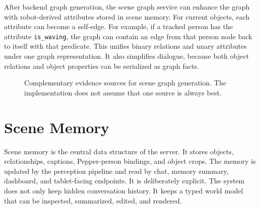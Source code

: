 After backend graph generation, the scene graph service can enhance the graph with robot-derived attributes stored in scene memory. For current objects, each attribute can become a self-edge. For example, if a tracked person has the attribute \texttt{is\_waving}, the graph can contain an edge from that person node back to itself with that predicate. This unifies binary relations and unary attributes under one graph representation. It also simplifies dialogue, because both object relations and object properties can be serialized as graph facts.

\begin{figure}[t]
\centering
{}
\caption{Complementary evidence sources for scene graph generation. The implementation does not assume that one source is always best.}
\label{fig:server-sgg-sources}
\end{figure}

\section{Scene Memory}\label{sec:server-scene-memory}

Scene memory is the central data structure of the server. It stores objects, relationships, captions, Pepper-person bindings, and object crops. The memory is updated by the perception pipeline and read by chat, memory summary, dashboard, and tablet-facing endpoints. It is deliberately explicit. The system does not only keep hidden conversation history. It keeps a typed world model that can be inspected, summarized, edited, and rendered.

